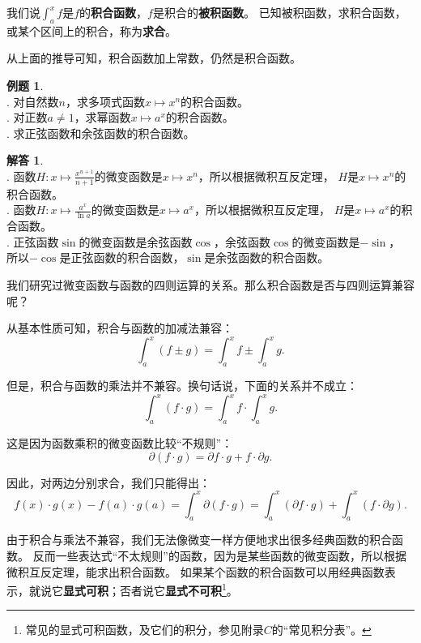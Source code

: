 \documentclass[12pt,UTF8]{ctexbook}
\theoremstyle{definition}
\newtheorem{et}{例题}[section]
\newtheorem*{so}{解答}
\theoremstyle{plain}
\begin{document}
我们说$\int_a^x f$是$f$的\textbf{积合函数}，$f$是积合的\textbf{被积函数}。
已知被积函数，求积合函数，或某个区间上的积合，称为\textbf{求合}。

从上面的推导可知，积合函数加上常数，仍然是积合函数。

\begin{et}
    \mbox{} \\
    . 对自然数$n$，求多项式函数$x\mapsto x^n$的积合函数。\\
    . 对正数$a\neq 1$，求幂函数$x\mapsto a^x$的积合函数。\\
    . 求正弦函数和余弦函数的积合函数。
\end{et}

\begin{so}
    \mbox{} \\
    . 函数$H: x\mapsto \frac{x^{n+1}}{n+1}$的微变函数是$x\mapsto x^n$，所以根据微积互反定理，
    $H$是$x\mapsto x^n$的积合函数。\\
    . 函数$H: x\mapsto \frac{a^x}{\ln{a}}$的微变函数是$x\mapsto a^x$，所以根据微积互反定理，
    $H$是$x\mapsto a^x$的积合函数。\\
    . 正弦函数$\sin$的微变函数是余弦函数$\cos$，余弦函数$\cos$的微变函数是$-\sin$，
    所以$-\cos$是正弦函数的积合函数，$\sin$是余弦函数的积合函数。
\end{so}

我们研究过微变函数与函数的四则运算的关系。那么积合函数是否与四则运算兼容呢？

从基本性质可知，积合与函数的加减法兼容：
$$ \int_a^x (f \pm g) = \int_a^x f \pm \int_a^x g. $$

但是，积合与函数的乘法并不兼容。换句话说，下面的关系并不成立：
$$ \int_a^x (f \cdot g) = \int_a^x f \cdot \int_a^x g. $$

这是因为函数乘积的微变函数比较“不规则”：
$$ \partial (f\cdot g) = \partial f \cdot g + f \cdot \partial g.$$

因此，对两边分别求合，我们只能得出：
$$ f(x)\cdot g(x) - f(a)\cdot g(a) = \int_a^x \partial (f\cdot g) = \int_a^x (\partial f \cdot g) + \int_a^x (f \cdot \partial g). $$

由于积合与乘法不兼容，我们无法像微变一样方便地求出很多经典函数的积合函数。
反而一些表达式“不太规则”的函数，因为是某些函数的微变函数，所以根据微积互反定理，能求出积合函数。
如果某个函数的积合函数可以用经典函数表示，就说它\textbf{显式可积}；否者说它\textbf{显式不可积}\footnote{常见的显式可积函数，及它们的积分，参见附录$C$的“常见积分表”。}。
\end{document}
